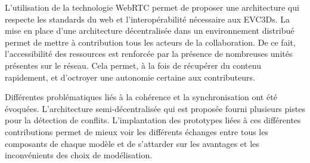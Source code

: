 L'utilisation de la 
technologie WebRTC permet de proposer une 
architecture qui respecte les standards du web et l'interopérabilité nécessaire aux \glspl{EVC3D}. La mise en place d'une architecture décentralisée dans un 
environnement distribué permet de mettre à contribution tous les acteurs de la 
collaboration. De ce fait, l'accessibilité des ressources est renforcée par la 
présence de nombreuses unités présentes sur le réseau. Cela permet, à la fois 
de récupérer du contenu rapidement, et d'octroyer une autonomie certaine aux 
contributeurs. 

Différentes problématiques liés à la cohérence et la synchronisation ont été 
évoquées. L'architecture semi-décentralisée qui est proposée fourni plusieurs 
pistes pour la détection de conflits. L'implantation des prototypes liées à ces 
différentes contributions permet de mieux voir les différents échanges entre tous 
les composants de chaque modèle et de s'attarder sur les avantages et les 
inconvénients des choix de modélisation.

